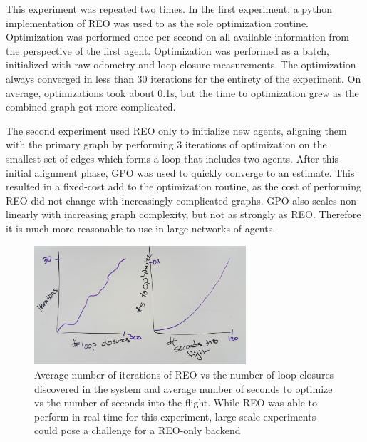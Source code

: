 This experiment was repeated two times.  In the first experiment, a python implementation of REO was used to as the sole optimization routine.  Optimization was performed once per second on all available information from the perspective of the first agent.  Optimization was performed as a batch, initialized with raw odometry and loop closure measurements.  The optimization always converged in less than 30 iterations for the entirety of the experiment.  On average, optimizations took about 0.1s, but the time to optimization grew as the combined graph got more complicated.

The second experiment used REO only to initialize new agents, aligning them with the primary graph by performing 3 iterations of optimization on the smallest set of edges which forms a loop that includes two agents.   After this initial alignment phase, GPO was used to quickly converge to an estimate.  This resulted in a fixed-cost add to the optimization routine, as the cost of performing REO did not change with increasingly complicated graphs.  GPO also scales non-linearly with increasing graph complexity, but not as strongly as REO.  Therefore it is much more reasonable to use in large networks of agents.

\begin{figure}[H]
  \includegraphics[width=0.7\textwidth]{figures/REO_only_timing_results.jpg}
  \caption{Average number of iterations of REO vs the number of loop closures discovered in the system and average number of seconds to optimize vs the number of seconds into the flight.  While REO was able to perform in real time for this experiment, large scale experiments could pose a challenge for a REO-only backend}
  \label{fig:REO_only_hardware_results}
\end{figure}
